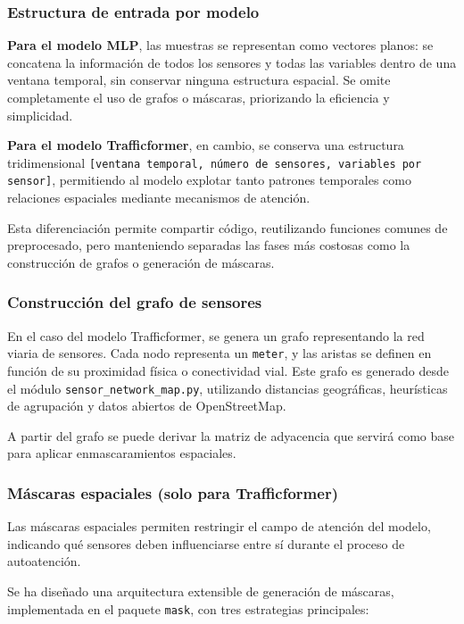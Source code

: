 \subsubsection{Estructura de entrada por modelo}

\textbf{Para el modelo MLP}, las muestras se representan como vectores planos: se concatena la información de todos los sensores y todas las variables dentro de una ventana temporal, sin conservar ninguna estructura espacial. Se omite completamente el uso de grafos o máscaras, priorizando la eficiencia y simplicidad.

\textbf{Para el modelo Trafficformer}, en cambio, se conserva una estructura tridimensional \texttt{[ventana temporal, número de sensores, variables por sensor]}, permitiendo al modelo explotar tanto patrones temporales como relaciones espaciales mediante mecanismos de atención.

Esta diferenciación permite compartir código, reutilizando funciones comunes de preprocesado, pero manteniendo separadas las fases más costosas como la construcción de grafos o generación de máscaras.

\subsubsection{Construcción del grafo de sensores}

En el caso del modelo Trafficformer, se genera un grafo representando la red viaria de sensores. Cada nodo representa un \texttt{meter}, y las aristas se definen en función de su proximidad física o conectividad vial. Este grafo es generado desde el módulo \texttt{sensor\_network\_map.py}, utilizando distancias geográficas, heurísticas de agrupación y datos abiertos de OpenStreetMap.

A partir del grafo se puede derivar la matriz de adyacencia que servirá como base para aplicar enmascaramientos espaciales.

\subsubsection{Máscaras espaciales (solo para Trafficformer)}

Las máscaras espaciales permiten restringir el campo de atención del modelo, indicando qué sensores deben influenciarse entre sí durante el proceso de autoatención.

Se ha diseñado una arquitectura extensible de generación de máscaras, implementada en el paquete \texttt{mask}, con tres estrategias principales:

